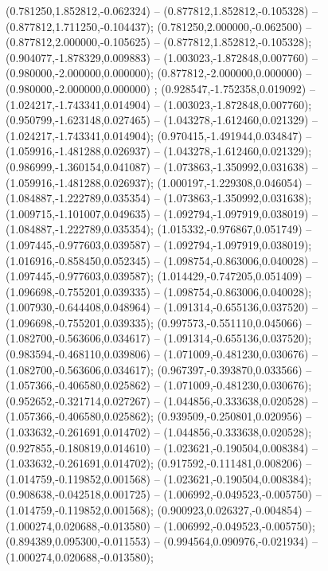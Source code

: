  (0.781250,1.852812,-0.062324) -- (0.877812,1.852812,-0.105328) -- (0.877812,1.711250,-0.104437);
 (0.781250,2.000000,-0.062500) -- (0.877812,2.000000,-0.105625) -- (0.877812,1.852812,-0.105328);
 (0.904077,-1.878329,0.009883) -- (1.003023,-1.872848,0.007760) -- (0.980000,-2.000000,0.000000);
 (0.877812,-2.000000,0.000000) -- (0.980000,-2.000000,0.000000) ;
 (0.928547,-1.752358,0.019092) -- (1.024217,-1.743341,0.014904) -- (1.003023,-1.872848,0.007760);
 (0.950799,-1.623148,0.027465) -- (1.043278,-1.612460,0.021329) -- (1.024217,-1.743341,0.014904);
 (0.970415,-1.491944,0.034847) -- (1.059916,-1.481288,0.026937) -- (1.043278,-1.612460,0.021329);
 (0.986999,-1.360154,0.041087) -- (1.073863,-1.350992,0.031638) -- (1.059916,-1.481288,0.026937);
 (1.000197,-1.229308,0.046054) -- (1.084887,-1.222789,0.035354) -- (1.073863,-1.350992,0.031638);
 (1.009715,-1.101007,0.049635) -- (1.092794,-1.097919,0.038019) -- (1.084887,-1.222789,0.035354);
 (1.015332,-0.976867,0.051749) -- (1.097445,-0.977603,0.039587) -- (1.092794,-1.097919,0.038019);
 (1.016916,-0.858450,0.052345) -- (1.098754,-0.863006,0.040028) -- (1.097445,-0.977603,0.039587);
 (1.014429,-0.747205,0.051409) -- (1.096698,-0.755201,0.039335) -- (1.098754,-0.863006,0.040028);
 (1.007930,-0.644408,0.048964) -- (1.091314,-0.655136,0.037520) -- (1.096698,-0.755201,0.039335);
 (0.997573,-0.551110,0.045066) -- (1.082700,-0.563606,0.034617) -- (1.091314,-0.655136,0.037520);
 (0.983594,-0.468110,0.039806) -- (1.071009,-0.481230,0.030676) -- (1.082700,-0.563606,0.034617);
 (0.967397,-0.393870,0.033566) -- (1.057366,-0.406580,0.025862) -- (1.071009,-0.481230,0.030676);
 (0.952652,-0.321714,0.027267) -- (1.044856,-0.333638,0.020528) -- (1.057366,-0.406580,0.025862);
 (0.939509,-0.250801,0.020956) -- (1.033632,-0.261691,0.014702) -- (1.044856,-0.333638,0.020528);
 (0.927855,-0.180819,0.014610) -- (1.023621,-0.190504,0.008384) -- (1.033632,-0.261691,0.014702);
 (0.917592,-0.111481,0.008206) -- (1.014759,-0.119852,0.001568) -- (1.023621,-0.190504,0.008384);
 (0.908638,-0.042518,0.001725) -- (1.006992,-0.049523,-0.005750) -- (1.014759,-0.119852,0.001568);
 (0.900923,0.026327,-0.004854) -- (1.000274,0.020688,-0.013580) -- (1.006992,-0.049523,-0.005750);
 (0.894389,0.095300,-0.011553) -- (0.994564,0.090976,-0.021934) -- (1.000274,0.020688,-0.013580);
